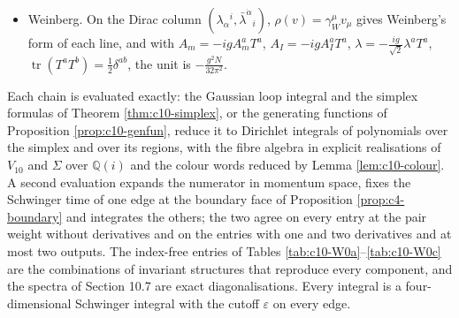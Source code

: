 \begin{remark}
\begin{itemize}
\[
D_1:\ (A_{ij},A_{kl})\mapsto\Big[8A_{kl}A_{ij}-2\varepsilon_{ijkl}A^{mn}A_{mn}-8A_{ij}A_{kl}-\tfrac12\big(\tfrac13+\theta\big)\big(\big((2E+2)A_{ij}\big)A_{kl}+A_{ij}\big((2E+2)A_{kl}\big)\big)\Big]\ \text{units},
\]
so that on $\operatorname{tr}(A_{I_1}\cdots A_{I_L})$, $D_1=-8$ units times $\sum_l(1-\text{exchange}+\tfrac12\,\text{trace})_{l,l+1}$ minus $(\tfrac13+\theta)$ units times $2(E+L)$. For the Konishi operator $\tfrac14\int\omega\,(A^{ij},A_{ij})$ at $\theta=-\tfrac13$, $D_1=-48$ units times $O$, which is $\frac{3g^2N}{2\pi^2}O$ for $\mathfrak{su}(N)$, twice the Konishi anomalous dimension $\frac{3g^2N}{4\pi^2}$.
\item Weinberg. On the Dirac column $(\lambda_\alpha{}^i,\bar\lambda^{\dot\alpha}{}_i)$, $\rho(v)=\gamma_W^\mu v_\mu$ gives Weinberg's form of each line, and with $A_m=-igA^a_mT^a$, $A_I=-igA^a_IT^a$, $\lambda=-\tfrac{ig}{\sqrt2}\lambda^aT^a$, $\operatorname{tr}(T^aT^b)=\tfrac12\delta^{ab}$, the unit is $-\frac{g^2N}{32\pi^2}$.
\end{itemize}
\end{remark}

\begin{remark}
\label{rem:c10-method}
Each chain is evaluated exactly: the Gaussian loop integral and the simplex formulas of Theorem \ref{thm:c10-simplex}, or the generating functions of Proposition \ref{prop:c10-genfun}, reduce it to Dirichlet integrals of polynomials over the simplex and over its regions, with the fibre algebra in explicit realisations of $V_{10}$ and $\Sigma$ over $\mathbb Q(i)$ and the colour words reduced by Lemma \ref{lem:c10-colour}. A second evaluation expands the numerator in momentum space, fixes the Schwinger time of one edge at the boundary face of Proposition \ref{prop:c4-boundary} and integrates the others; the two agree on every entry at the pair weight without derivatives and on the entries with one and two derivatives and at most two outputs. The index-free entries of Tables \ref{tab:c10-W0a}--\ref{tab:c10-W0c} are the combinations of invariant structures that reproduce every component, and the spectra of Section 10.7 are exact diagonalisations. Every integral is a four-dimensional Schwinger integral with the cutoff $\varepsilon$ on every edge.
\end{remark}
